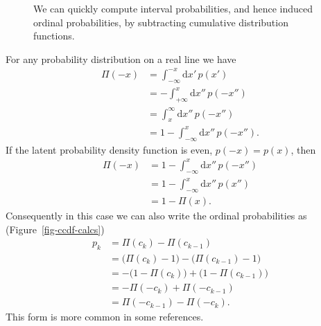 \documentclass[
  letterpaper,
  DIV=11,
  numbers=noendperiod]{scrartcl}
\begin{document}
\begin{figure}


\caption{\label{fig-cdf-calcs}We can quickly compute interval
probabilities, and hence induced ordinal probabilities, by subtracting
cumulative distribution functions.}

\end{figure}%

For any probability distribution on a real line we have \begin{align*}
\Pi(-x)
&=
\int_{-\infty}^{-x} \mathrm{d} x' \, p(x')
\\
&=
-\int_{+\infty}^{x} \mathrm{d} x'' \, p(-x'')
\\
&=
\int_{x}^{\infty} \mathrm{d} x'' \, p(-x'')
\\
&=
1 - \int_{-\infty}^{x} \mathrm{d} x'' \, p(-x'').
\end{align*} If the latent probability density function is even,
\(p(-x) = p(x)\), then \begin{align*}
\Pi(-x)
&=
1 - \int_{-\infty}^{x} \mathrm{d} x'' \, p(-x'')
\\
&=
1 - \int_{-\infty}^{x} \mathrm{d} x'' \, p(x'')
\\
&=
1 - \Pi(x).
\end{align*} Consequently in this case we can also write the ordinal
probabilities as (Figure~\ref{fig-ccdf-calcs}) \begin{align*}
p_{k}
&=
\Pi(c_{k}) - \Pi(c_{k - 1})
\\
&=
\big( \Pi(c_{k}) - 1 \big) - \big( \Pi(c_{k - 1}) - 1 \big)
\\
&=
- \big( 1 - \Pi(c_{k}) \big) + \big( 1 - \Pi(c_{k - 1}) \big)
\\
&=
- \Pi(-c_{k}) + \Pi(-c_{k - 1})
\\
&=
\Pi(-c_{k - 1}) - \Pi(-c_{k}).
\end{align*} This form is more common in some references.
\end{document}
